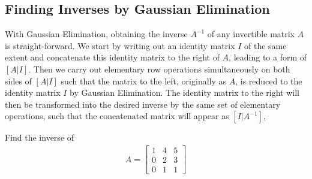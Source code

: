 \subsection{Finding Inverses by Gaussian Elimination}
\label{subsection:invGauss}
With Gaussian Elimination, obtaining the inverse $A^{-1}$ of any invertible matrix $A$ is straight-forward. We start by writing out an identity matrix $I$ of the same extent and concatenate this identity matrix to the right of $A$, leading to a form of $[A|I]$. Then we carry out elementary row operations simultaneously on both sides of $[A|I]$ such that the matrix to the left, originally as $A$, is reduced to the identity matrix $I$ by Gaussian Elimination. The identity matrix to the right will then be transformed into the desired inverse by the same set of elementary operations, such that the concatenated matrix will appear as $[I|A^{-1}]$, 
\begin{exmp}
Find the inverse of
\begin{align*}
A =
\begin{bmatrix}
1 & 4 & 5 \\
0 & 2 & 3 \\
0 & 1 & 1
\end{bmatrix}
\end{align*}
\end{exmp}
